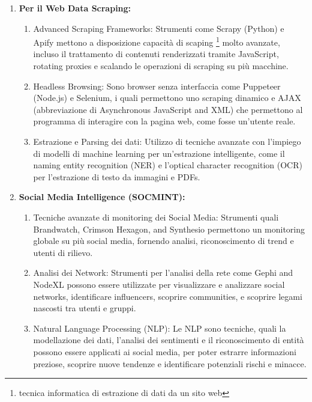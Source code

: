 	\begin{enumerate} 
	\item \textbf{Per il Web Data Scraping: }
		\begin{enumerate}
			\item Advanced Scraping Frameworks: Strumenti come Scrapy (Python) e Apify mettono a disposizione capacità di scaping \footnote{tecnica informatica di estrazione di dati da un sito web} molto avanzate, incluso il trattamento di contenuti renderizzati tramite JavaScript, rotating proxies e scalando le operazioni di scraping su più macchine. 
			\item Headless Browsing: Sono browser senza interfaccia come Puppeteer (Node.js) e Selenium, i quali permettono uno scraping dinamico e AJAX (abbreviazione di Asynchronous JavaScript and XML) che permettono al programma di interagire con la pagina web, come fosse un'utente reale.
            \item Estrazione e Parsing dei dati: Utilizzo di tecniche avanzate con l'impiego di modelli di machine learning per un'estrazione intelligente, come il naming entity recognition (NER) e l'optical character recognition (OCR) per l'estrazione di testo da immagini e PDFs.
		\end{enumerate}

    \item \textbf{Social Media Intelligence (SOCMINT):}
        \begin{enumerate}
            \item Tecniche avanzate di monitoring dei Social Media: Strumenti quali Brandwatch, Crimson Hexagon, and Synthesio permettono un monitoring globale su più social media, fornendo analisi, riconoscimento di trend e utenti di rilievo.
            \item Analisi dei Network: Strumenti per l'analisi della rete come Gephi and NodeXL possono essere utilizzate per visualizzare e analizzare social networks, identificare influencers, scoprire communities, e scoprire legami nascosti tra utenti e gruppi.
            \item Natural Language Processing (NLP): Le NLP sono tecniche, quali la modellazione dei dati, l'analisi dei sentimenti e il riconoscimento di entità possono essere applicati ai social media, per poter estrarre informazioni preziose, scoprire nuove tendenze e identificare potenziali rischi e minacce.
        \end{enumerate}


\end{enumerate}
